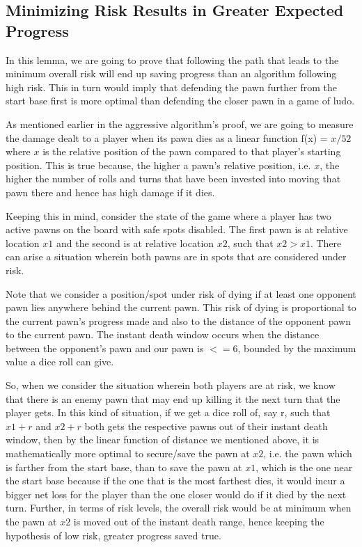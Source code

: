 \documentclass{article} %
\begin{document}
\subsection{Minimizing Risk Results in Greater Expected Progress}
In this lemma, we are going to prove that following the path that leads to the minimum overall risk will end up saving progress than an algorithm following high risk. This in turn would imply that defending the pawn further from the start base first is more optimal than defending the closer pawn in a game of ludo.

As mentioned earlier in the aggressive algorithm’s proof, we are going to measure the damage dealt to a player when its pawn dies as a linear function f(x) = $x/52$ where $x$ is the relative position of the pawn compared to that player’s starting position. This is true because, the higher a pawn’s relative position, i.e. $x$, the higher the number of rolls and turns that have been invested into moving that pawn there and hence has high damage if it dies.

Keeping this in mind, consider the state of the game where a player has two active pawns on the board with safe spots disabled. The first pawn is at relative location $x1$ and the second is at relative location $x2$, such that $x2 > x1$. There can arise a situation wherein both pawns are in spots that are considered under risk. 

Note that we consider a position/spot under risk of dying if at least one opponent pawn lies anywhere behind the current pawn. This risk of dying is proportional to the current pawn’s progress made and also to the distance of the opponent pawn to the current pawn. The instant death window occurs when the distance between the opponent’s pawn and our pawn is $<= 6$, bounded by the maximum value a dice roll can give.

So, when we consider the situation wherein both players are at risk, we know that there is an enemy pawn that may end up killing it the next turn that the player gets. In this kind of situation, if we get a dice roll of, say r, such that $x1+r$ and $x2+r$ both gets the respective pawns out of their instant death window, then by the linear function of distance we mentioned above, it is mathematically more optimal to secure/save the pawn at $x2$, i.e. the pawn which is farther from the start base, than to save the pawn at $x1$, which is the one near the start base because if the one that is the most farthest dies, it would incur a bigger net loss for the player than the one closer would do if it died by the next turn. Further, in terms of risk levels, the overall risk would be at minimum when the pawn at $x2$ is moved out of the instant death range, hence keeping the hypothesis of low risk, greater progress saved true.
\end{document}
